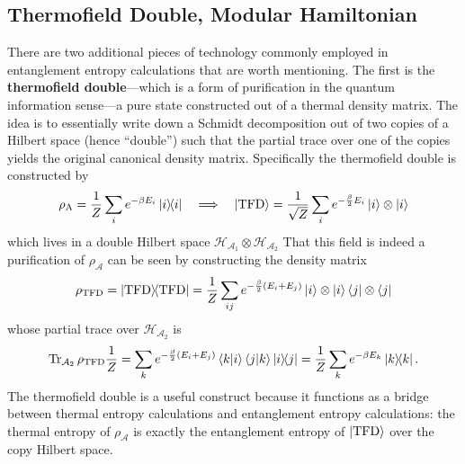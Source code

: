 \documentclass{report}
\begin{document}
\subsection{Thermofield Double, Modular Hamiltonian}
There are two additional pieces of technology commonly employed in 
entanglement entropy calculations that are worth mentioning. The first 
is the \textbf{thermofield double}---which is a form of purification in the 
quantum information sense---a pure state constructed out of a thermal density 
matrix. The idea is to essentially write down a Schmidt decomposition out of 
two copies of a Hilbert space (hence ``double'') such that the partial trace 
over one of the copies yields the original canonical density matrix. 
Specifically the thermofield double is constructed by 
\begin{equation*}
	\rho_{\text{A}} = \frac{1}{Z} \sum_i e^{-\beta E_i} \ketbra{i}
	\quad\Longrightarrow \quad 
	\ket{\text{TFD}} = \frac{1}{\sqrt{Z}}\sum_ie^{-\frac{\beta}{2}E_i} \ket{i}
		\otimes \ket{i}
\end{equation*}
which lives in a double Hilbert space $ \mathcal{H}_{\mathcal{A}_1}\otimes 
\mathcal{H}_{\mathcal{A}_2}$ That this field is indeed a purification of $
\rho_{\mathcal{A}} $ can be seen by constructing the density matrix
\begin{equation*}
	\rho_{\text{TFD}} = \ketbra{\text{TFD}}
		= \frac{1}{Z} \sum_{ij} e^{-\frac{\beta}{2}(E_i + E_j)}
			\ket{i}\otimes \ket{i}\bra{j}\otimes \bra{j}
\end{equation*}
whose partial trace over $ \mathcal{H}_{\mathcal{A}_2} $ is 
\begin{equation*}
	\Tr_{\mathcal{A}_2}\rho_{\text{TFD}} \frac{1}{Z} =
		\sum_k e^{-\frac{\beta}{2}(E_i + E_j)} \braket{k}{i}\braket{j}{k}
			\ketbra{i}{j} 
		= \frac{1}{Z} \sum_k e^{-\beta E_k} \ketbra{k}.
\end{equation*}
The thermofield double is a useful construct because it functions as a bridge 
between thermal entropy calculations and entanglement entropy calculations: 
the thermal entropy of $ \rho_\mathcal{A} $ is exactly the entanglement entropy 
of $ \ket{\text{TFD}} $ over the copy Hilbert space.
\end{document}
